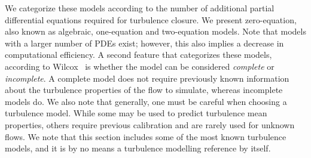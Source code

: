 We categorize these models according to the number of additional partial differential equations required for turbulence closure. We present zero-equation, also known as algebraic, one-equation and two-equation models. Note that models with a larger number of PDEs exist; however, this also implies a decrease in computational efficiency. A second feature that categorizes these models, according to Wilcox~\cite{wilcox1998turbulence} is whether the model can be considered \textit{complete} or \textit{incomplete}. A complete model does not require previously known information about the turbulence properties of the flow to simulate, whereas incomplete models do. We also note that generally, one must be careful when choosing a turbulence model. While some may be used to predict turbulence mean properties, others require previous calibration and are rarely used for unknown flows. We note that this section includes some of the most known turbulence models, and it is by no means a turbulence modelling reference by itself.

